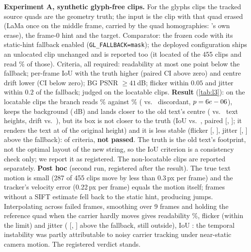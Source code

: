 \textbf{Experiment A, synthetic glyph-free clips.} For the \lthreeGlyphs{} glyphs clips the tracked source quads are the geometry truth; the input is the clip with that quad erased (LaMa once on the middle frame, carried by the quad homographies: \method's own erase), the frame-0 hint and the target. Comparator: the frozen code with its static-hint fallback enabled (\texttt{GL\_FALLBACK=mask}); the deployed configuration ships an unlocated clip unchanged and is reported too (it located \lthreeADepN{} of the 455 clips and read \lthreeADepRead\% of those). Criteria, all required: readability at most one point below the fallback; per-frame IoU with the truth higher (paired CI above zero) and centre drift lower (CI below zero); BG PSNR $\geq 41$\,dB; flicker within $0.05$ and jitter within $0.2$ of the fallback; judged on the locatable clips. \textbf{Result} (\cref{tab:l3}): on the \lthreeALoc{} locatable clips the branch reads \lthreeACarRead\% against \lthreeABfbRead\% (\lthreeAWins{} vs.\ \lthreeALosses{} discordant, $p=6e-06$), keeps the background (\lthreeACarBG\,dB) and lands closer to the old text's centre (\lthreeACarOffset{} vs.\ \lthreeABfbOffset{} text heights, drift \lthreeACarDrift{} vs.\ \lthreeABfbDrift), but its box is not closer to the truth (IoU \lthreeACarIoU{} vs.\ \lthreeABfbIoU, paired \lthreeAIoUMean{} [\lthreeAIoULo, \lthreeAIoUHi]; it renders the text at \lthreeACarHeightRatio{} of the original height) and it is less stable (flicker \lthreeAFlickerMean{} [\lthreeAFlickerLo, \lthreeAFlickerHi], jitter \lthreeAJitterMean{} [\lthreeAJitterLo, \lthreeAJitterHi] above the fallback): \lthreeAPassed{} of \lthreeACriteria{} criteria, \textbf{not passed}. The truth is the old text's footprint, not the optimal layout of the new string, so the IoU criterion is a consistency check only; we report it as registered. The \lthreeANotLoc{} non-locatable clips are reported separately. \textbf{Post hoc} (second run, registered after the result). The true text motion is small (287 of 455 clips move by less than 0.3\,px per frame) and the tracker's velocity error (0.22\,px per frame) equals the motion itself; frames without a SIFT estimate fell back to the static hint, producing jumps. Interpolating across failed frames, smoothing over 9 frames and holding the reference quad when the carrier hardly moves gives readability \lthreeAtwoRead\%, flicker \lthreeAtwoFlicker{} (within the limit) and jitter \lthreeAtwoJitter{} (\lthreeAtwoJitterPMean{} [\lthreeAtwoJitterPLo, \lthreeAtwoJitterPHi] above the fallback, still outside), IoU \lthreeAtwoIoU: the temporal instability was partly attributable to noisy carrier tracking under near-static camera motion. The registered verdict stands.

